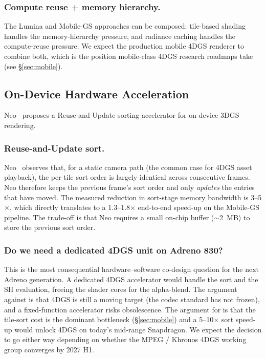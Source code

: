 \subsubsection{Compute reuse + memory hierarchy.}
The Lumina and Mobile-GS approaches can be composed: tile-based
shading handles the memory-hierarchy pressure, and radiance
caching handles the compute-reuse pressure. We expect the
production mobile 4DGS renderer to combine both, which is the
position mobile-class 4DGS research roadmaps take
(see \S\ref{sec:mobile}).

\subsection{On-Device Hardware Acceleration}
Neo~\cite{oh2025neo} proposes a Reuse-and-Update sorting accelerator
for on-device 3DGS rendering.

\subsubsection{Reuse-and-Update sort.}
Neo~\cite{oh2025neo} observes that, for a static camera path
(the common case for 4DGS asset playback), the per-tile sort
order is largely identical across consecutive frames. Neo
therefore keeps the previous frame's sort order and only
\emph{updates} the entries that have moved. The measured
reduction in sort-stage memory bandwidth is 3--5$\times$, which
directly translates to a 1.3--1.8$\times$ end-to-end speed-up
on the Mobile-GS pipeline. The trade-off is that Neo requires
a small on-chip buffer ($\sim$2~MB) to store the previous
sort order.

\subsubsection{Do we need a dedicated 4DGS unit on Adreno 830?}
This is the most consequential hardware--software co-design
question for the next Adreno generation. A dedicated 4DGS
accelerator would handle the sort and the SH evaluation, freeing
the shader cores for the alpha-blend. The argument against is
that 4DGS is still a moving target (the codec standard has not
frozen), and a fixed-function accelerator risks obsolescence.
The argument for is that the tile-sort cost is the dominant
bottleneck (\S\ref{sec:mobile}) and a 5--10$\times$ sort speed-up
would unlock 4DGS on today's mid-range Snapdragon. We expect
the decision to go either way depending on whether the MPEG / Khronos
4DGS working group converges by 2027 H1.

